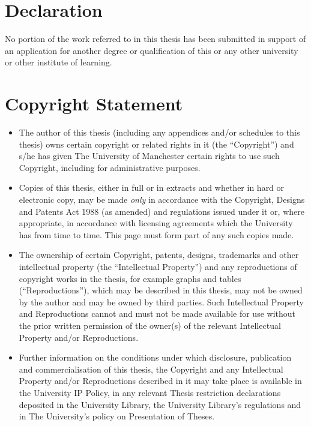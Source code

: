 \documentclass[12pt,a4paper]{report}
\begin{document}
\cleardoublepage
\chapter*{Declaration}
\noindent No portion of the work referred to in this thesis has been submitted
in support of an application for another degree or qualification of this or
any other university or other institute of learning.

\cleardoublepage
\chapter*{Copyright Statement}
\begin{itemize}
\item[i.] The author of this thesis (including any appendices and/or
  schedules to this thesis) owns certain copyright or related rights in it
  (the ``Copyright'') and s/he has given The University of Manchester certain
  rights to use such Copyright, including for administrative purposes.
\item[ii.] Copies of this thesis, either in full or in extracts and whether
  in hard or electronic copy, may be made \emph{only} in accordance with the
  Copyright, Designs and Patents Act 1988 (as amended) and regulations issued
  under it or, where appropriate, in accordance with licensing agreements
  which the University has from time to time. This page must form part of any
  such copies made.
\item[iii.] The ownership of certain Copyright, patents, designs, trademarks
  and other intellectual property (the ``Intellectual Property'') and any
  reproductions of copyright works in the thesis, for example graphs and
  tables (``Reproductions''), which may be described in this thesis, may not
  be owned by the author and may be owned by third parties. Such Intellectual
  Property and Reproductions cannot and must not be made available for use
  without the prior written permission of the owner(s) of the relevant
  Intellectual Property and/or Reproductions.
\item[iv.] Further information on the conditions under which disclosure,
  publication and commercialisation of this thesis, the Copyright and any
  Intellectual Property and/or Reproductions described in it may take place
  is available in the University IP Policy, in any relevant Thesis
  restriction declarations deposited in the University Library, the
  University Library's regulations and in The University's policy on
  Presentation of Theses.
\end{itemize}
\end{document}
